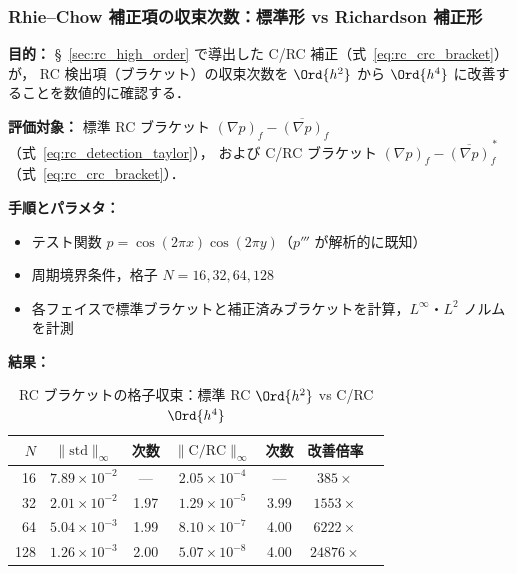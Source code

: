 \subsubsection{Rhie--Chow 補正項の収束次数：標準形 vs Richardson 補正形}
\label{sec:verify_rc_bracket}

\noindent\textbf{目的：}
§~\ref{sec:rc_high_order} で導出した C/RC 補正（式~\eqref{eq:rc_crc_bracket}）が，
RC 検出項（ブラケット）の収束次数を $\Ord{h^2}$ から $\Ord{h^4}$ に改善することを数値的に確認する．

\noindent\textbf{評価対象：}
標準 RC ブラケット $(\nabla p)_f - \overline{(\nabla p)}_f$（式~\eqref{eq:rc_detection_taylor}），
および C/RC ブラケット $(\nabla p)_f - \overline{(\nabla p)}_f^{\,*}$（式~\eqref{eq:rc_crc_bracket}）．

\noindent\textbf{手順とパラメタ：}
\begin{itemize}[noitemsep]
  \item テスト関数 $p = \cos(2\pi x)\cos(2\pi y)$（$p'''$ が解析的に既知）
  \item 周期境界条件，格子 $N = 16, 32, 64, 128$
  \item 各フェイスで標準ブラケットと補正済みブラケットを計算，$L^\infty$・$L^2$ ノルムを計測
\end{itemize}

\noindent\textbf{結果：}

\begin{table}[htbp]
\centering
\caption{RC ブラケットの格子収束：標準 RC $\Ord{h^2}$ vs C/RC $\Ord{h^4}$}
\label{tab:rc_bracket_convergence}
\renewcommand{\arraystretch}{1.3}
\begin{tabular}{rcccccc}
\toprule
$N$ & $\|\text{std}\|_\infty$ & 次数 & $\|\text{C/RC}\|_\infty$ & 次数 & 改善倍率 \\
\midrule
 16 & $7.89 \times 10^{-2}$ & ---  & $2.05 \times 10^{-4}$ & ---  & $385\times$ \\
 32 & $2.01 \times 10^{-2}$ & 1.97 & $1.29 \times 10^{-5}$ & 3.99 & $1553\times$ \\
 64 & $5.04 \times 10^{-3}$ & 1.99 & $8.10 \times 10^{-7}$ & 4.00 & $6222\times$ \\
128 & $1.26 \times 10^{-3}$ & 2.00 & $5.07 \times 10^{-8}$ & 4.00 & $24876\times$ \\
\bottomrule
\end{tabular}
\end{table}

